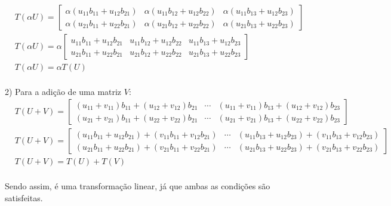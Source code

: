 \[
    \begin{split}
        &T(\alpha U) = \begin{bmatrix}
            \alpha (u_{11}b_{11} +  u_{12}b_{21}) & \alpha (u_{11}b_{12} + u_{12}b_{22}) & \alpha (u_{11}b_{13} +  u_{12}b_{23}) \\
            \alpha (u_{21}b_{11} +  u_{22}b_{21}) & \alpha (u_{21}b_{12} + u_{22}b_{22}) & \alpha (u_{21}b_{13} +  u_{22}b_{23})
        \end{bmatrix}\\
        &T(\alpha U) = \alpha\begin{bmatrix}
            u_{11}b_{11} + u_{12}b_{21} & u_{11}b_{12} + u_{12}b_{22} & u_{11}b_{13} + u_{12}b_{23} \\
            u_{21}b_{11} + u_{22}b_{21} & u_{21}b_{12} + u_{22}b_{22} & u_{21}b_{13} + u_{22}b_{23}
        \end{bmatrix}\\
        &T(\alpha U) = \alpha T(U)
    \end{split}
\]
\\

2) Para a adição de uma matriz $V$:\\

\[
    \begin{split}
        &T(U+V) = \begin{bmatrix}
            (u_{11}+v_{11})b_{11} + (u_{12}+v_{12})b_{21} & \cdots & (u_{11}+v_{11})b_{13} + (u_{12}+v_{12})b_{23} \\
            (u_{21}+v_{21})b_{11} + (u_{22}+v_{22})b_{21} & \cdots & (u_{21}+v_{21})b_{13} + (u_{22}+v_{22})b_{23}
        \end{bmatrix}\\
        &T(U+V) = \begin{bmatrix}
            (u_{11}b_{11}+u_{12}b_{21}) + (v_{11}b_{11}+v_{12}b_{21}) & \cdots & (u_{11}b_{13}+u_{12}b_{23}) + (v_{11}b_{13}+v_{12}b_{23}) \\
            (u_{21}b_{11}+u_{22}b_{21}) + (v_{21}b_{11}+v_{22}b_{21}) & \cdots & (u_{21}b_{13}+u_{22}b_{23}) + (v_{21}b_{13}+v_{22}b_{23})
        \end{bmatrix}\\
        &T(U+V)= T(U)+T(V)
    \end{split}
\]
\\

Sendo assim, \textcolor{COLOR2}{é uma transformação linear}, já que ambas as condições são satisfeitas.\\